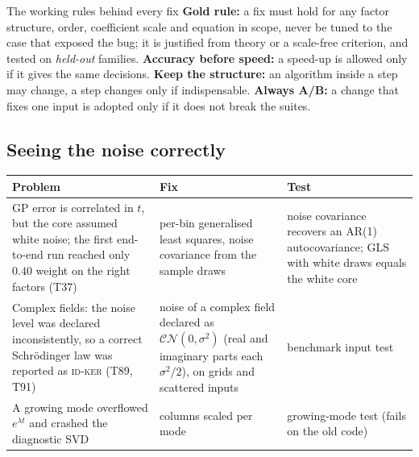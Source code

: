 \documentclass[11pt,a4paper]{article}
\theoremstyle{definition}
\begin{document}
\begin{notebox}{The working rules behind every fix}
\textbf{Gold rule:} a fix must hold for any factor structure, order, coefficient scale and equation in scope, never be tuned to the case that exposed the bug; it is justified from theory or a scale-free criterion, and tested on \emph{held-out} families. \textbf{Accuracy before speed:} a speed-up is allowed only if it gives the same decisions. \textbf{Keep the structure:} an algorithm inside a step may change, a step changes only if indispensable. \textbf{Always A/B:} a change that fixes one input is adopted only if it does not break the suites.
\end{notebox}

\subsection{Seeing the noise correctly}
\begin{center}\small
\begin{tabular}{@{}L{4.1cm}L{4.4cm}L{4.4cm}@{}}
\toprule
Problem & Fix & Test\\\midrule
GP error is correlated in $t$, but the core assumed white noise; the first end-to-end run reached only $0.40$ weight on the right factors (T37) & per-bin generalised least squares, noise covariance from the sample draws & noise covariance recovers an AR(1) autocovariance; GLS with white draws equals the white core\\
Complex fields: the noise level was declared inconsistently, so a correct Schr\"odinger law was reported as \textsc{id-ker} (T89, T91) & noise of a complex field declared as $\mathcal{CN}(0,\sigma^2)$ (real and imaginary parts each $\sigma^2/2$), on grids and scattered inputs & benchmark input test\\
A growing mode overflowed $e^{\lambda t}$ and crashed the diagnostic SVD & columns scaled per mode & growing-mode test (fails on the old code)\\
\bottomrule
\end{tabular}
\end{center}
\end{document}
